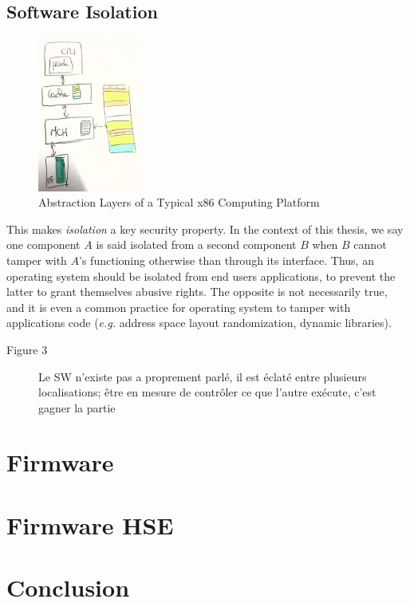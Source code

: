\subsection{Software Isolation}

\begin{figure}
  \centering
  \includegraphics[width=0.3\textwidth]{Figures/computing-platform-3.jpg}
  \caption{Abstraction Layers of a Typical x86 Computing Platform}
  \label{fig:usecase:computing-platform-3}
\end{figure}

This makes \emph{isolation} a key security property.
%
In the context of this thesis, we say one component $A$ is said isolated from a
second component $B$ when $B$ cannot tamper with $A$'s functioning otherwise
than through its interface.
%
Thus, an operating system should be isolated from end users applications, to
prevent the latter to grant themselves abusive rights.
%
The opposite is not necessarily true, and it is even a common practice for
operating system to tamper with applications code (\emph{e.g.} address space
layout randomization, dynamic libraries).

\newpage


\begin{description}
\item [Figure 3] Le SW n'existe pas a proprement parlé, il est éclaté entre
  plusieurs localisations; être en mesure de contrôler ce que l’autre exécute,
  c’est gagner la partie
\end{description}


\section{Firmware}
\label{sec:usecase:firmware}

\section{Firmware HSE}
\label{sec:usecase:hse}

\section{Conclusion}
\label{sec:usecase:conclusion}
